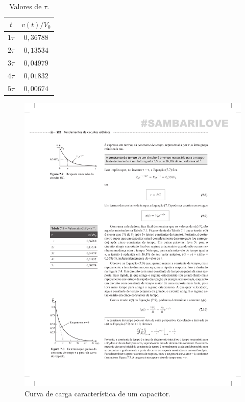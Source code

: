 \begin{table}
\begin{center}
\caption{Valores de $\tau$.}
\begin{tabular}{@{}cc@{}}
\toprule
\textbf{$t$}  &\textbf{ $v(t)/V_0$} \\ \midrule
$1\tau$ & $0,36788$ \\
$2\tau$ & $0,13534$ \\
$3\tau$ & $0,04979$ \\
$4\tau$ & $0,01832$ \\
$5\tau$ & $0,00674$ \\ \bottomrule
\end{tabular}
\end{center}  
\label{tb:capacitor}
\end{table}

\begin{figure}
  \caption{Curva de carga característica de um capacitor.}
  \begin{center}
      \includegraphics[scale=1]{img/capacitor.pdf}
  \end{center}
  \label{fig:capacitor}
\end{figure}


